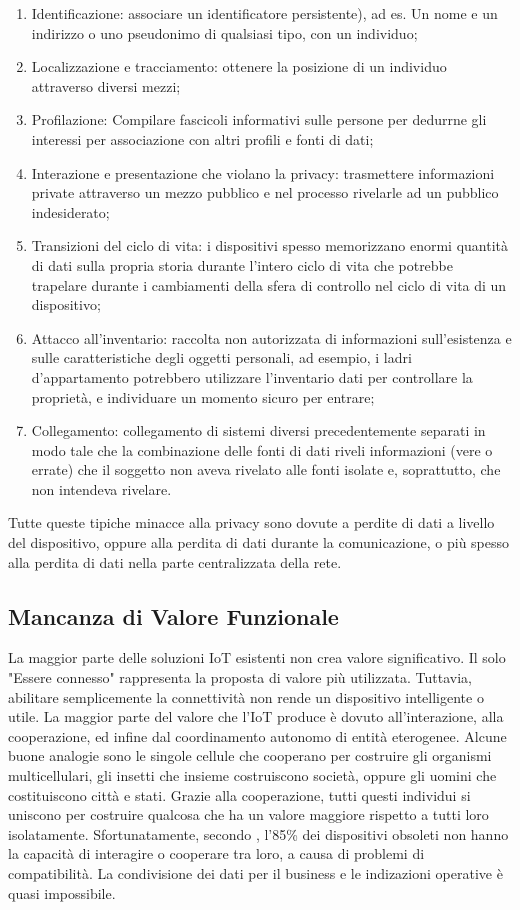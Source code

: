 \documentclass[a4paper,12pt]{article}
\begin{document}
\begin{enumerate}

	\item
	      Identificazione: associare un identificatore  persistente), ad es. Un nome e un indirizzo o uno pseudonimo di qualsiasi tipo, con un individuo;
	\item
	      Localizzazione e tracciamento: ottenere la posizione di un individuo attraverso diversi mezzi;
	\item
	      Profilazione: Compilare fascicoli informativi sulle persone per dedurrne gli interessi per
	      associazione con altri profili e fonti di dati;
	\item
	      Interazione e presentazione che violano la privacy: trasmettere informazioni private attraverso un mezzo pubblico e nel processo rivelarle ad un pubblico indesiderato;
	\item
	      Transizioni del ciclo di vita: i dispositivi spesso memorizzano enormi quantità di dati sulla propria storia durante l'intero ciclo di vita che potrebbe trapelare durante i cambiamenti della sfera di controllo nel ciclo di vita di un dispositivo;
	\item
	      Attacco all'inventario: raccolta non autorizzata di informazioni sull'esistenza e sulle caratteristiche degli oggetti personali, ad esempio, i ladri d'appartamento potrebbero utilizzare l'inventario dati per controllare la proprietà, e individuare un momento sicuro per entrare;
	\item
	      Collegamento: collegamento di sistemi diversi precedentemente separati in modo tale che la combinazione delle fonti di dati riveli informazioni (vere o errate) che il soggetto non aveva rivelato alle fonti isolate e, soprattutto, che non intendeva rivelare.
\end{enumerate}
Tutte queste tipiche minacce alla privacy sono dovute a perdite di dati a livello del dispositivo, oppure alla perdita di dati durante la comunicazione, o più spesso alla perdita di dati nella parte centralizzata della rete.

\subsection{Mancanza di Valore Funzionale}
La maggior parte delle soluzioni IoT esistenti non crea valore significativo. Il solo "Essere connesso" rappresenta la proposta di valore più utilizzata. Tuttavia, abilitare semplicemente la connettività non rende un dispositivo intelligente o utile. La maggior parte del valore che l'IoT produce è dovuto all'interazione, alla cooperazione, ed infine dal coordinamento autonomo di entità eterogenee. Alcune buone analogie sono le singole cellule che cooperano per costruire gli organismi multicellulari, gli insetti che insieme costruiscono società, oppure gli uomini che costituiscono città e stati. Grazie alla cooperazione, tutti questi individui si uniscono per costruire qualcosa che ha un valore maggiore rispetto a tutti loro isolatamente. Sfortunatamente, secondo \cite{c29}, l'85\% dei dispositivi obsoleti non hanno la capacità di interagire o cooperare tra loro, a causa di problemi di compatibilità. La condivisione dei dati per il business e le indizazioni operative è quasi impossibile.
\end{document}
